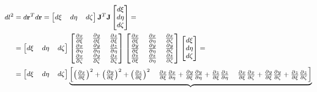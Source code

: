 \documentclass
[
a4paper,                      %
twoside,					  %
12pt,                         %
abstract,		      %
fleqn,                        %
]
{scrartcl} %
\begin{document}
\begin{description}
\begin{equation}
\footnotesize
\begin{aligned}
dl^{2}&=d\mathbf{r}^{T}d\mathbf{r}=\begin{bmatrix}
d\xi&
d\eta&
d\zeta\\
\end{bmatrix}\mathbf{J}^{T}\mathbf{J}\begin{bmatrix}
d\xi\\
d\eta\\
d\zeta\\
\end{bmatrix}=\\&=\begin{bmatrix}
d\xi&
d\eta&
d\zeta\\
\end{bmatrix}\begin{bmatrix}
\frac{\partial x}{\partial\xi}&\frac{\partial y}{\partial\xi}&\frac{\partial z}{\partial\xi}\\
\frac{\partial x}{\partial\eta}&\frac{\partial y}{\partial\eta}&\frac{\partial z}{\partial\eta}\\
\frac{\partial x}{\partial\zeta}&\frac{\partial y}{\partial\zeta}&\frac{\partial z}{\partial\zeta}\\
\end{bmatrix}\begin{bmatrix}
\frac{\partial x}{\partial\xi}&\frac{\partial x}{\partial\eta}&\frac{\partial x}{\partial\zeta}\\
\frac{\partial y}{\partial\xi}&\frac{\partial y}{\partial\eta}&\frac{\partial y}{\partial\zeta}\\
\frac{\partial z}{\partial\xi}&\frac{\partial z}{\partial\eta}&\frac{\partial z}{\partial\zeta}\\
\end{bmatrix}\begin{bmatrix}
d\xi\\
d\eta\\
d\zeta\\
\end{bmatrix}=\\&=\begin{bmatrix}
d\xi&
d\eta&
d\zeta\\
\end{bmatrix}\underbrace{\begin{bmatrix}
\left(\frac{\partial x}{\partial\xi}\right)^{2}+\left(\frac{\partial y}{\partial\xi}\right)^{2}+\left(\frac{\partial z}{\partial\xi}\right)^{2}&\frac{\partial x}{\partial\xi}\frac{\partial x}{\partial\eta}+\frac{\partial y}{\partial\xi}\frac{\partial y}{\partial\eta}+\frac{\partial z}{\partial\xi}\frac{\partial z}{\partial\eta}&\frac{\partial x}{\partial\xi}\frac{\partial x}{\partial\zeta}+\frac{\partial y}{\partial\xi}\frac{\partial y}{\partial\zeta}+\frac{\partial z}{\partial\xi}\frac{\partial z}{\partial\zeta}\\

\end{bmatrix}}
\end{aligned}
\end{equation}
\end{description}
\end{document}
